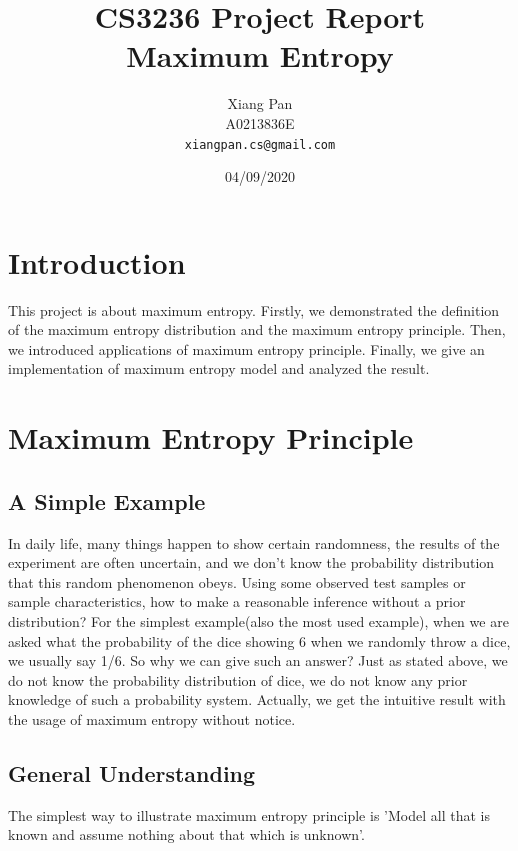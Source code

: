 \documentclass[12pt, a4paper]{article}
\begin{document}
\title{CS3236 Project Report\\  Maximum Entropy }
\author{Xiang Pan \\ A0213836E \\ \texttt{xiangpan.cs@gmail.com}}
\date{04/09/2020} %
\maketitle


\section{Introduction}
This project is about maximum entropy. Firstly, we demonstrated the definition of the maximum entropy distribution and the maximum entropy principle. Then, we introduced applications of maximum entropy principle. Finally, we give an implementation of maximum entropy model and analyzed the result.



\section{Maximum Entropy Principle}
\subsection{A Simple Example}
In daily life, many things happen to show certain randomness, the results of the experiment are often uncertain, and we don't know the probability distribution that this random phenomenon obeys. Using some observed test samples or sample characteristics, how to
make a reasonable inference without a prior distribution?
For the simplest example(also the most used example), when we are asked what the probability of the dice showing 6 when we randomly throw a dice, we usually say 1/6. So why we can give such an answer? Just as stated above, we do not know the probability distribution of dice, we do not know any prior knowledge of such a probability system. Actually, we get the intuitive result with the usage of maximum entropy without notice.

\subsection{General Understanding}
The simplest way to illustrate maximum entropy principle is 'Model all that is known and assume nothing about that which is unknown'.
\end{document}

